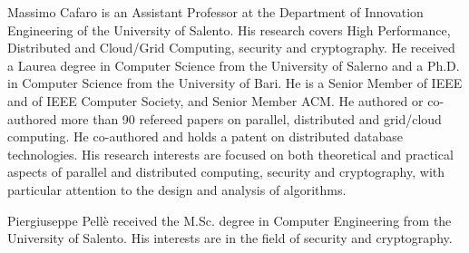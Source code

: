 \documentclass[10pt,journal,cspaper,compsoc]{IEEEtran}
\begin{document}





\begin{IEEEbiography}{Massimo Cafaro}
is an Assistant Professor at the Department of Innovation Engineering of the University of Salento. His research covers High Performance, Distributed and Cloud/Grid Computing, security and cryptography. He received a Laurea degree in Computer Science from the University of Salerno and a Ph.D. in Computer Science from the University of Bari. He is a Senior Member of IEEE and of IEEE Computer Society, and Senior Member ACM. He authored or co-authored more than 90 refereed papers on parallel, distributed and grid/cloud computing. He co-authored and holds a patent on distributed database technologies. His research interests are focused on both theoretical and practical aspects of parallel and distributed computing, security and cryptography, with particular attention to the design and analysis of algorithms.
\end{IEEEbiography}

\begin{IEEEbiography}{Piergiuseppe Pell\`e}
received the M.Sc. degree in Computer Engineering from the University of Salento. His interests are in the field of security and cryptography.
\end{IEEEbiography}
\end{document}

